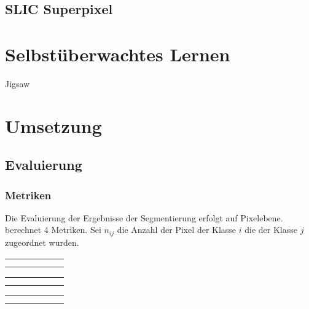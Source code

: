 \section{SLIC Superpixel}
\cite{achanta_slic_2010}

\chapter{Selbstüberwachtes Lernen}
\label{chap:selfsupervised}

Jigsaw
\cite{noroozi_unsupervised_2016}
\chapter{Umsetzung}

\section{Evaluierung}


\subsection{Metriken}
Die Evaluierung der Ergebnisse der Segmentierung erfolgt auf Pixelebene.
\cite{long_fully_2015} berechnet 4 Metriken.
Sei \(n_{ij}\) die Anzahl der Pixel der Klasse \(i\) die der Klasse \(j\) zugeordnet wurden.


\newcommand{\resulttable}[3]{
    \begin{tabular}{l|r|r|r|r|r}%
    \hline
        \csvreader[head to column names, filter equal={\dataset}{#2}]{#1}{}%
        {#3}
        \\\hline
        \end{tabular}
}

\resulttable{results/document_image_segmentation_results.csv}{CB55}{\\ \name & \pixelacc & \FgPA & \meanacc & \meanIU & \fwIU}
\resulttable{results/document_image_segmentation_results.csv}{CSG18}{\\  \pixelacc & \FgPA & \meanacc & \meanIU & \fwIU}
\resulttable{results/document_image_segmentation_results.csv}{CSG863}{\\  \pixelacc & \FgPA & \meanacc & \meanIU & \fwIU}

